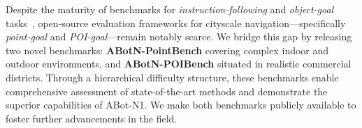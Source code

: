 Despite the maturity of benchmarks for \textit{instruction-following} and \textit{object-goal} tasks~\cite{anderson2018vln,ku2020rxr,krantz2020vlnce,yokoyama2024hmovon}, open-source evaluation frameworks for cityscale navigation—specifically \textit{point-goal} and \textit{POI-goal}—remain notably scarce. 
We bridge this gap by releasing two novel benchmarks: \textbf{ABotN-PointBench} covering complex indoor and outdoor environments, and \textbf{ABotN-POIBench} situated in realistic commercial districts. 
Through a hierarchical difficulty structure, these benchmarks enable comprehensive assessment of state-of-the-art methods and demonstrate the superior capabilities of ABot-N1. 
We make both benchmarks publicly available to foster further advancements in the field.

